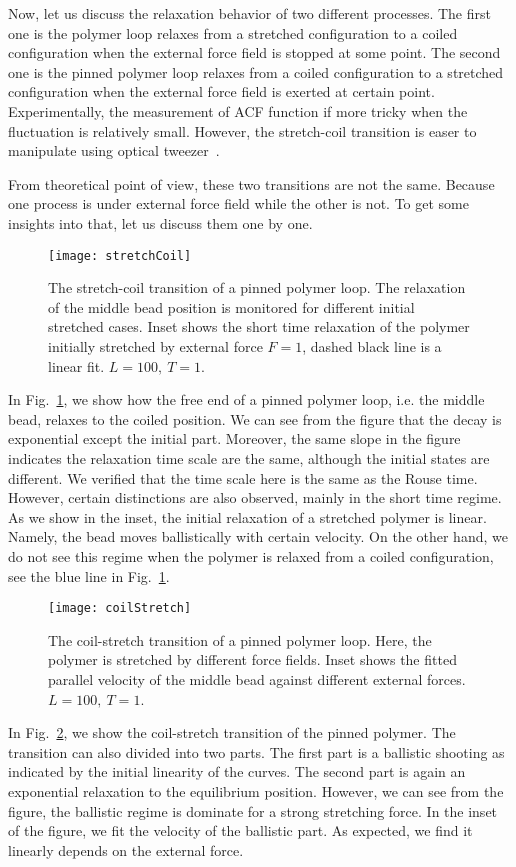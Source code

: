 Now, let us discuss the relaxation behavior of two different processes. The first one is the polymer loop relaxes from a stretched configuration to a coiled configuration when the external force field is stopped at some point. The second one is the pinned polymer loop relaxes from a coiled configuration to a stretched configuration when the external force field is exerted at certain point. 
Experimentally, the measurement of ACF function if more tricky when the fluctuation is relatively small. However, the stretch-coil transition is easer to manipulate using optical tweezer~\cite{Perkins1994a,Perkins1994}.

From theoretical point of view, these two transitions are not the same. Because one process is under external force field while the other is not. To get some insights into that, let us discuss them one by one. 

\begin{figure}[htpb]
    \centering
    \texttt{[image: stretchCoil]}
    \caption{The stretch-coil transition of a pinned polymer loop. The relaxation of the middle bead position is monitored for different initial stretched cases. Inset shows the short time relaxation of the polymer initially stretched by external force $F=1$, dashed black line is a linear fit. $L=100, ~T=1$.}
    \label{fig:stretchCoil}
\end{figure}
In Fig.~\ref{fig:stretchCoil}, we show how the free end of a pinned polymer loop, i.e. the middle bead, relaxes to the coiled position. We can see from the figure that the decay is exponential except the initial part. Moreover, the same slope in the figure indicates the relaxation time scale are the same, although the initial states are different. We verified that the time scale here is the same as the Rouse time. However, certain distinctions are also observed, mainly in the short time regime. As we show in the inset, the initial relaxation of a stretched polymer is linear. Namely, the bead moves ballistically with certain velocity. On the other hand, we do not see this regime when the polymer is relaxed from a coiled configuration, see the blue line in Fig.~\ref{fig:stretchCoil}.

\begin{figure}[htpb]
    \centering
    \texttt{[image: coilStretch]}
    \caption{The coil-stretch transition of a pinned polymer loop. Here, the polymer is stretched by different force fields. Inset shows the fitted parallel velocity of the middle bead against different external forces. $L=100,~T=1$.}
    \label{fig:coilStretch}
\end{figure}
In Fig.~\ref{fig:coilStretch}, we show the coil-stretch transition of the pinned polymer. The transition can also divided into two parts. The first part is a ballistic shooting as indicated by the initial linearity of the curves. The second part is again an exponential relaxation to the equilibrium position. However, we can see from the figure, the ballistic regime is dominate for a strong stretching force. In the inset of the figure, we fit the velocity of the ballistic part. As expected, we find it linearly depends on the external force. 

